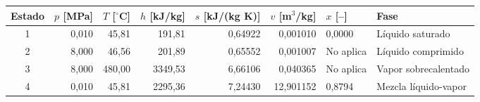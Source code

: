 \begin{tabular}{crrrrrlp{}}
\toprule
Estado & $p$ [MPa] & $T$ [$^\circ$C] & $h$ [kJ/kg] & $s$ [kJ/(kg K)] & $v$ [m$^3$/kg] & $x$ [--] & Fase\\
\midrule
1 & 0,010 & 45,81 & 191,81 & 0,64922 & 0,001010 & 0,0000 & Líquido saturado \\
2 & 8,000 & 46,56 & 201,89 & 0,65552 & 0,001007 & No aplica & Líquido comprimido \\
3 & 8,000 & 480,00 & 3349,53 & 6,66106 & 0,040365 & No aplica & Vapor sobrecalentado \\
4 & 0,010 & 45,81 & 2295,36 & 7,24430 & 12,901152 & 0,8794 & Mezcla líquido-vapor \\
\bottomrule
\end{tabular}
